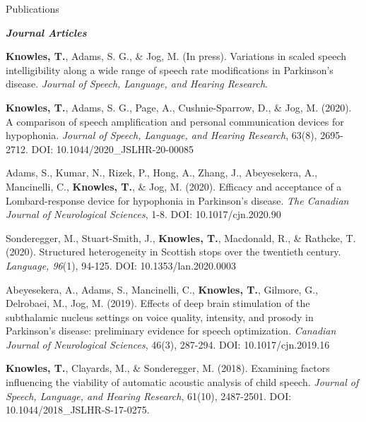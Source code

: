 \documentclass{resume} %
\begin{document}
\begin{rSection}{Publications}

\begin{center}
	{\bf \emph{Journal Articles}}
\end{center}

\begin{etaremune}

	\item {\bf Knowles, T.}, Adams, S. G., \& Jog, M. (In press). Variations in scaled speech intelligibility along a wide range of speech rate modifications in Parkinson’s disease. \emph{Journal of Speech, Language, and Hearing Research}.

	\item {\bf Knowles, T.}, Adams, S. G., Page, A., Cushnie-Sparrow, D., \& Jog, M. (2020). A comparison of speech amplification and personal communication devices for hypophonia. \emph{Journal of Speech, Language, and Hearing Research}, 63(8), 2695-2712. DOI: 10.1044/2020\_JSLHR-20-00085
	
	\item Adams, S., Kumar, N., Rizek, P., Hong, A., Zhang, J., Abeyesekera, A., Mancinelli, C., {\bf Knowles, T.}, \& Jog, M. (2020). Efficacy and acceptance of a Lombard-response device for hypophonia in Parkinson’s disease. \emph{The Canadian Journal of Neurological Sciences}, 1-8. DOI: 10.1017/cjn.2020.90

	\item Sonderegger, M., Stuart-Smith, J., {\bf Knowles, T.}, Macdonald, R., \& Rathcke, T. (2020). Structured heterogeneity in Scottish stops over the twentieth century. \emph{Language, 96}(1), 94-125. DOI: 10.1353/lan.2020.0003
	
	\item Abeyesekera, A., Adams, S., Mancinelli, C., {\bf Knowles, T.}, Gilmore, G., Delrobaei, M., Jog, M. (2019).  Effects of deep brain stimulation of the subthalamic nucleus settings on voice quality, intensity, and prosody in Parkinson’s disease: preliminary evidence for speech optimization. \emph{Canadian Journal of Neurological Sciences}, 46(3), 287-294. DOI: 10.1017/cjn.2019.16	

	\item {\bf Knowles, T.}, Clayards, M., \& Sonderegger, M. (2018). Examining factors influencing the viability of automatic acoustic analysis of child speech. \emph{Journal of Speech, Language, and Hearing Research}, 61(10), 2487-2501. DOI: 10.1044/2018\_JSLHR-S-17-0275.


\end{etaremune}
\end{rSection}
\end{document}
